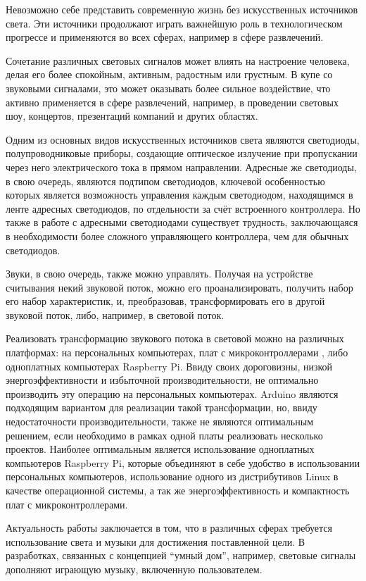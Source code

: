 \intro

Невозможно себе представить современную жизнь без искусственных источников света. Эти источники продолжают играть важнейшую роль в технологическом прогрессе и применяются во всех сферах, например в сфере развлечений.

Сочетание различных световых сигналов может влиять на настроение человека, делая его более спокойным, активным, радостным или грустным. В купе со звуковыми сигналами, это может оказывать более сильное воздействие, что активно применяется в сфере развлечений, например, в проведении световых шоу, концертов, презентаций компаний и других областях.

Одним из основных видов искусственных источников света являются светодиоды, полупроводниковые приборы, создающие оптическое излучение при пропускании через него электрического тока в прямом направлении. Адресные же светодиоды, в свою очередь, являются подтипом светодиодов, ключевой особенностью которых является возможность управления каждым светодиодом, находящимся в ленте адресных светодиодов, по отдельности за счёт встроенного контроллера. Но также в работе с адресными светодиодами существует трудность, заключающаяся в необходимости более сложного управляющего контроллера, чем для обычных светодиодов.

Звуки, в свою очередь, также можно управлять. Получая на устройстве считывания некий звуковой поток, можно его проанализировать, получить набор его набор характеристик, и, преобразовав, трансформировать его в другой звуковой поток, либо, например, в световой поток.

Реализовать трансформацию звукового потока в световой можно на различных платформах: на персональных компьютерах, плат с микроконтроллерами , либо одноплатных компьютерах Raspberry Pi. Ввиду своих дороговизны, низкой энергоэффективности и избыточной производительности, не оптимально производить эту операцию на персональных компьютерах. Arduino являются подходящим вариантом для реализации такой трансформации, но, ввиду недостаточности производительности, также не являются оптимальным решением, если необходимо в рамках одной платы реализовать несколько проектов. Наиболее оптимальным является использование одноплатных компьютеров Raspberry Pi, которые объединяют в себе удобство в использовании персональных компьютеров, использование одного из дистрибутивов Linux в качестве операционной системы, а так же энергоэффективность и компактность плат с микроконтроллерами.

Актуальность работы заключается в том, что в различных сферах требуется использование света и музыки для достижения поставленной цели. В разработках, связанных с концепцией ``умный дом'', например, световые сигналы дополняют играющую музыку, включенную пользователем.

